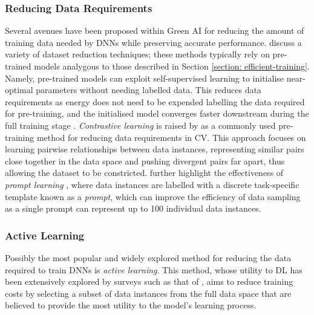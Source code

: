 \documentclass[a4paper, 11pt]{report}
\begin{document}
    \subsubsection{Reducing Data Requirements}

    Several avenues have been proposed within Green AI for reducing the amount of training data needed by DNNs while preserving accurate performance. \citet{xu-2021} discuss a variety of dataset reduction techniques; these methods typically rely on pre-trained models analygous to those described in Section \ref{section: efficient-training}. Namely, pre-trained models can exploit self-supervised learning to initialise near-optimal parameters without needing labelled data. This reduces data requirements as energy does not need to be expended labelling the data required for pre-training, and the initialised model converges faster downstream during the full training stage \citep{xu-2021}. \emph{Contrastive learning} \citep{chen-2020} is raised by \citet{xu-2021} as a commonly used pre-training method for reducing data requirements in CV. This approach focuses on learning pairwise relationships between data instances, representing similar pairs close together in the data space and pushing divergent pairs far apart, thus allowing the dataset to be constricted. \citet{xu-2021} further highlight the effectiveness of \emph{prompt learning} \citep{liu-2021}, where data instances are labelled with a discrete task-specific template known as a \emph{prompt}, which can improve the efficiency of data sampling as a single prompt can represent up to 100 individual data instances. 


    \subsubsection{Active Learning}
    \label{section: active-learning}

    Possibly the most popular and widely explored method for reducing the data required to train DNNs is \emph{active learning}. This method, whose utility to DL has been extensively explored by surveys such as that of \citet{ren-2021}, aims to reduce training costs by selecting a subset of data instances from the full data space that are believed to provide the most utility to the model's learning process. 
\end{document}
